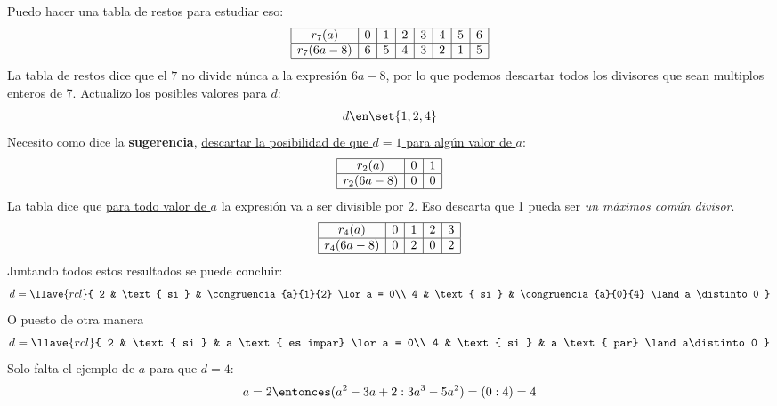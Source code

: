 \begin{enumerate}[label=\roman*)]
        Puedo hacer una tabla de restos para estudiar eso:
        $$
          \begin{array}{|c|c|c|c|c|c|c|c|} \hline
            r_7(a)      & 0 & 1 & 2 & 3 & 4 & 5 & 6 \\ \hline
            r_7(6a - 8) & 6 & 5 & 4 & 3 & 2 & 1 & 5 \\ \hline
          \end{array}
        $$
        La tabla de restos dice que el $7$ no divide núnca a la expresión $6a -8$, por lo que podemos
        descartar todos los divisores que sean multiplos enteros de 7. Actualizo los posibles valores para $d$:
        $$
          d \en \set{1, 2, 4}
        $$
        Necesito como dice la \textbf{sugerencia}, \ul{descartar la posibilidad de que $d = 1$ para algún valor de $a$}:
        $$
          \begin{array}{|c|c|c|} \hline
            r_2(a)      & 0 & 1 \\ \hline
            r_2(6a - 8) & 0 & 0 \\ \hline
          \end{array}
        $$
        La tabla dice que \ul{para todo valor de $a$} la expresión va a ser divisible por 2. Eso descarta que
        1 pueda ser \textit{un máximos común divisor}.
        $$
          \begin{array}{|c|c|c|c|c|} \hline
            r_4(a)      & 0 & 1 & 2 & 3 \\ \hline
            r_4(6a - 8) & 0 & 2 & 0 & 2 \\ \hline
          \end{array}
        $$
        Juntando todos estos resultados se puede concluir:
        $$
          d =
          \llave{rcl}{
            2 & \text{ si } & \congruencia{a}{1}{2}  \lor a = 0\\
            4 & \text{ si } & \congruencia{a}{0}{4} \land a \distinto 0
          }
        $$
        O puesto de otra manera
        $$
          d =
          \llave{rcl}{
            2 & \text{ si } & a \text{ es impar} \lor a = 0\\
            4 & \text{ si } & a \text{ par} \land a\distinto 0
          }
        $$
        Solo falta el ejemplo de $a$ para que $d = 4$:
        $$
          a = 2 \entonces (a^2 -3a + 2 : 3a^3 - 5a^2) = (0:4) = 4
        $$
\end{enumerate}

\begin{aportes}
  \item {}
\end{aportes}
